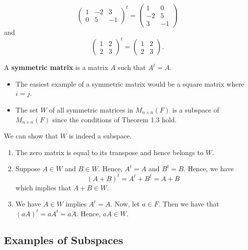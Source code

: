 \begin{eg}
    \[ \begin{pmatrix}
        1 & -2 & 3 \\
        0 & 5 & -1
    \end{pmatrix}^{t} =  \begin{pmatrix}
        1 & 0 \\ 
        -2 & 5 \\
        3 & -1
    \end{pmatrix}  \]
    and 
    \[  \begin{pmatrix}
        1 & 2 \\ 
        2 & 3 
        \end{pmatrix}^{t} = \begin{pmatrix}
            1 & 2 \\
            2 & 3
        \end{pmatrix}.\]
\end{eg}

\begin{definition}
    A \textbf{symmetric matrix} is a matrix \( A  \) such that \( A^{t} = A  \).
\end{definition}

\begin{itemize}
    \item The easiest example of a symmetric matrix would be a square matrix where \( i = j  \). 
    \item The set \( W  \) of all symmetric matrices in \( M_{n \times n}(F ) \) is a subspace of \( M_{n \times n}(F)  \) since the conditions of Theorem 1.3 hold.
\end{itemize}

We can show that \( W  \) is indeed a subspace.

\begin{enumerate}
    \item The zero matrix is equal to its transpose and hence belongs to \( W  \).
    \item Suppose \( A \in W  \) and \( B \in W  \). Hence, \( A^{t} = A  \) and \( B^{t} = B  \). Hence, we have 
        \[  (A+B)^{t} = A^{t} + B^{t} = A + B \]
        which implies that \( A + B \in W  \).
    \item We have \( A \in W  \) implies \( A^{t} = A  \). Now, let \( a \in F  \). Then we have that \( (aA)^{t} = a A^{t} = aA  \). Hence, \( aA \in W  \).
\end{enumerate}

\subsection{Examples of Subspaces}

